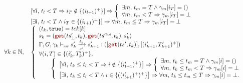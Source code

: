 \begin{skippableproof}
\begin{equation*}
\begin{array}{ll}
                                 & \left[\forall l, \, t_l < T \Rightarrow i_T \notin \{(i_{l+1})^+\} \right] \Rightarrow
            \left\{\begin{array}{ll}
                       \exists m, \, t_m = T \wedge \gamma_m[i_T] = () \\
                       \forall m, \, t_m < T \Rightarrow \gamma_m[i_T] = \bot
                   \end{array}\right.                                                                                                   \\
                                 & \left[\exists l, \, t_l < T \wedge i_T \in \{(i_{l+1})^+\} \right] \Rightarrow \forall m, \, t_m \le T \Rightarrow \gamma_m[i_T] = \bot \\
            \forall k \in \N, \, &
            \left\{
            \begin{array}{l}
                (t_k, \true) = \tck[k]                                                                         \\
                s_k = (\getAt{\ts'_\bot}{t_k}, \getAt{\ts^{\prime\explast}}{t_k}, s'_k)                        \\
                \sigmaOpSem{\gamma_k}{s'_k}{\sigma'}{t_k}{s'_{k+1}}{\getAt{\ts'}{t_k}}{(i'_{k+1}, T'_{k+1})^+} \\

                \forall (i, T) \in \{(i'_k, T'_k)^+\},                                                         \\
                \qquad \left\{
                \begin{array}{l}
                    \left[\forall l, \, t_k \le t_l < T \Rightarrow i \notin \{(i'_{l+1})^+\} \right]
                    \Rightarrow
                    \left\{\begin{array}{ll}
                               \exists m, \, t_k \le t_m = T \wedge \gamma_m[i] = () \\
                               \forall m, \, t_k \le t_m < T \Rightarrow \gamma_m[i] = \bot
                           \end{array}\right.          \\
                    \left[\exists l, \, t_k \le t_l < T \wedge i \in \{((i'_{l+1})^+)^+\} \right]
                    \Rightarrow \forall m, \, t_k \le t_m \le T \Rightarrow \gamma_m[i] = \bot. \\
                \end{array}
                \right.                                                                                        \\
            \end{array}
            \right.
        \end{array}
    \end{equation*}


\end{skippableproof}
